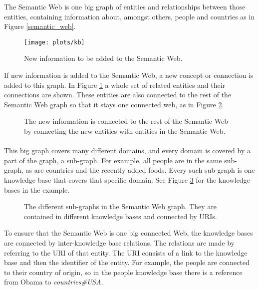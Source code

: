 \documentclass{article}
\begin{document}
 The Semantic Web is one big graph of entities and relationships between those entities, containing information about, amongst others, people and countries as in Figure \ref{semantic_web}.
 
 \begin{figure}[H]
 \centering
 \texttt{[image: plots/kb]}
 \caption[Knowledge base graph]{New information to be added to the Semantic Web.}
 \label{kb}
 \end{figure}
 
 If new information is added to the Semantic Web, a new concept or connection is added to this graph. In Figure \ref{kb} a whole set of related entities and their connections are shown. These entities are also connected to the rest of the Semantic Web graph so that it stays one connected web, as in Figure \ref{combine}.
 
 \begin{figure}[H]
 \centering
 \caption[Linking the knowledge base]{The new information is connected to the rest of the Semantic Web by connecting the new entities with entities in the Semantic Web.}
 \label{combine}
 \end{figure}
 
 \paragraph{}
 This big graph covers many different domains, and every domain is covered by a part of the graph, a sub-graph. For example, all people are in the same sub-graph, as are countries and the recently added foods. Every such sub-graph is one knowledge base that covers that specific domain. See Figure \ref{kbs} for the knowledge bases in the example.
 
 \begin{figure}[H]
 \centering
 \caption[Semantic Web knowledge base view]{The different sub-graphs in the Semantic Web graph. They are contained in different knowledge bases and connected by URIs.}
 \label{kbs}
 \end{figure}
 
 To ensure that the Semantic Web is one big connected Web, the knowledge bases are connected by inter-knowledge base relations. The relations are made by referring to the URI of that entity. The URI consists of a link to the knowledge base and then the identifier of the entity. For example, the people are connected to their country of origin, so in the people knowledge base there is a reference from Obama to \emph{countries\#USA}.
\end{document}
